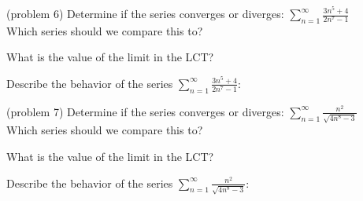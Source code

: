\documentclass[handout]{ximera}
\begin{document}
\begin{problem}(problem 6)
Determine if the series converges or diverges: $\displaystyle{\sum_{n=1}^\infty \frac{3n^5 + 4}{2n^7 - 1}}$\\
Which series should we compare this to?

\begin{multipleChoice}
\end{multipleChoice}

What is the value of the limit in the LCT?
\begin{multipleChoice}
\end{multipleChoice}

Describe the behavior of the series $\displaystyle{\sum_{n=1}^\infty \frac{3n^5 + 4}{2n^7 - 1}:}$
\begin{multipleChoice}
\end{multipleChoice}

\end{problem}


\begin{problem}(problem 7)
Determine if the series converges or diverges: $\displaystyle{\sum_{n=1}^\infty \frac{n^2}{\sqrt{4n^8 - 3}}}$\\
Which series should we compare this to?

\begin{multipleChoice}
\end{multipleChoice}

What is the value of the limit in the LCT?
\begin{multipleChoice}
\end{multipleChoice}

Describe the behavior of the series $\displaystyle{\sum_{n=1}^\infty \frac{n^2}{\sqrt{4n^8 - 3}}:}$
\begin{multipleChoice}
\end{multipleChoice}

\end{problem}
\end{document}
